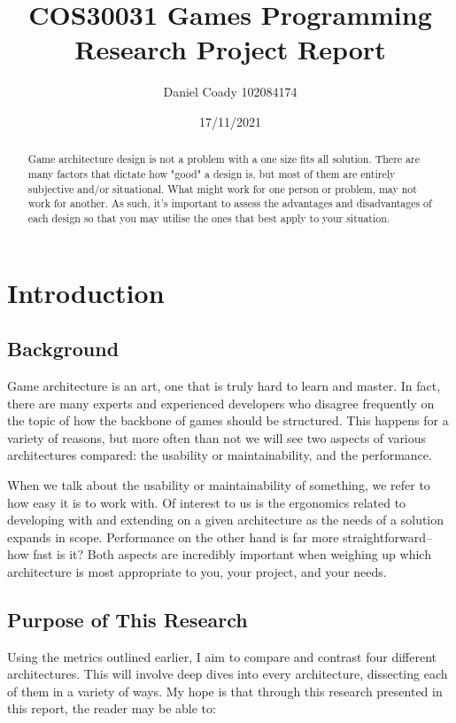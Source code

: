 \documentclass{article}
\title{COS30031 Games Programming\\Research Project Report}
\author{Daniel Coady 102084174}
\date{17/11/2021}
\begin{document}
\maketitle

\pagebreak

\tableofcontents

\pagebreak

\begin{abstract}
Game architecture design is not a problem with a one size fits all solution.
There are many factors that dictate how "good" a design is, but most of them are
entirely subjective and/or situational. What might work for one person or
problem, may not work for another. As such, it's important to assess the
advantages and disadvantages of each design so that you may utilise the ones
that best apply to your situation.
\end{abstract}

\section{Introduction}
\subsection{Background}
Game architecture is an art, one that is truly hard to learn and master. In
fact, there are many experts and experienced developers who disagree frequently
on the topic of how the backbone of games should be structured. This happens for
a variety of reasons, but more often than not we will see two aspects of various
architectures compared: the usability or maintainability, and the performance.

When we talk about the usability or maintainability of something, we refer to
how easy it is to work with. Of interest to us is the ergonomics related to
developing with and extending on a given architecture as the needs of a solution
expands in scope. Performance on the other hand is far more straightforward--how
fast is it? Both aspects are incredibly important when weighing up which
architecture is most appropriate to you, your project, and your needs.

\subsection{Purpose of This Research}
Using the metrics outlined earlier, I aim to compare and contrast four different
architectures. This will involve deep dives into every architecture, dissecting
each of them in a variety of ways. My hope is that through this research
presented in this report, the reader may be able to:
\end{document}
